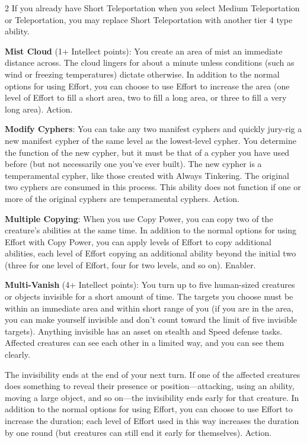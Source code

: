 \begin{multicols}{2}
If you already have Short Teleportation when you select Medium Teleportation or Teleportation, you may replace Short Teleportation with another tier 4 type ability.

\textbf{Mist Cloud} (1+ Intellect points): You create an area of mist an immediate distance across. The cloud lingers for about a minute unless conditions (such as wind or freezing temperatures) dictate otherwise. In addition to the normal options for using Effort, you can choose to use Effort to increase the area (one level of Effort to fill a short area, two to fill a long area, or three to fill a very long area). Action.

\textbf{Modify Cyphers}: You can take any two manifest cyphers and quickly jury-rig a new manifest cypher of the same level as the lowest-level cypher. You determine the function of the new cypher, but it must be that of a cypher you have used before (but not necessarily one you’ve ever built). The new cypher is a temperamental cypher, like those created with Always Tinkering. The original two cyphers are consumed in this process. This ability does not function if one or more of the original cyphers are temperamental cyphers. Action.

\textbf{Multiple Copying}: When you use Copy Power, you can copy two of the creature’s abilities at the same time. In addition to the normal options for using Effort with Copy Power, you can apply levels of Effort to copy additional abilities, each level of Effort copying an additional ability beyond the initial two (three for one level of Effort, four for two levels, and so on). Enabler.

\textbf{Multi-Vanish} (4+ Intellect points): You turn up to five human-sized creatures or objects invisible for a short amount of time. The targets you choose must be within an immediate area and within short range of you (if you are in the area, you can make yourself invisible and don’t count toward the limit of five invisible targets). Anything invisible has an asset on stealth and Speed defense tasks. Affected creatures can see each other in a limited way, and you can see them clearly.

The invisibility ends at the end of your next turn. If one of the affected creatures does something to reveal their presence or position—attacking, using an ability, moving a large object, and so on—the invisibility ends early for that creature. In addition to the normal options for using Effort, you can choose to use Effort to increase the duration; each level of Effort used in this way increases the duration by one round (but creatures can still end it early for themselves). Action.


\end{multicols}
